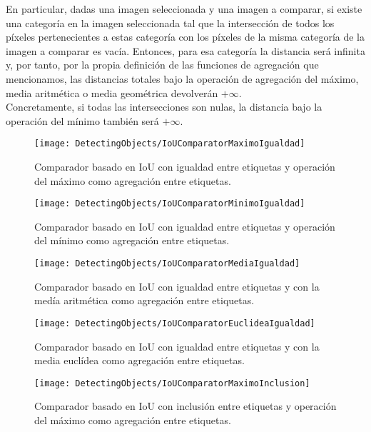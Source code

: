 En particular, dadas una imagen seleccionada y una imagen a comparar, si existe una categoría en la imagen seleccionada tal que la intersección de todos los píxeles pertenecientes a estas categoría con los píxeles de la misma categoría de la imagen a comparar es vacía. Entonces, para esa categoría la distancia será infinita y, por tanto, por la propia definición de las funciones de agregación que mencionamos, las distancias totales bajo la operación de agregación del máximo, media aritmética o media geométrica devolverán $+\infty$.\\

Concretamente, si todas las intersecciones son nulas, la distancia bajo la operación del mínimo también será $+\infty$.\\

\begin{figure}[htpb]
  \centering
  \texttt{[image: DetectingObjects/IoUComparatorMaximoIgualdad]}
  \caption{Comparador basado en IoU con igualdad entre etiquetas y operación del máximo como agregación entre etiquetas.}
  \label{fig:IoUComparatorMaximoIgualdad}
\end{figure}

\begin{figure}[htpb]
  \centering
  \texttt{[image: DetectingObjects/IoUComparatorMinimoIgualdad]}
  \caption{Comparador basado en IoU con igualdad entre etiquetas y operación del mínimo como agregación entre etiquetas.}
  \label{fig:IoUComparatorMinimoIgualdad}
\end{figure}

\begin{figure}[htpb]
  \centering
  \texttt{[image: DetectingObjects/IoUComparatorMediaIgualdad]}
  \caption{Comparador basado en IoU con igualdad entre etiquetas y con la medía aritmética como agregación entre etiquetas.}
  \label{fig:IoUComparatorMediaIgualdad}
\end{figure}

\begin{figure}[htpb]
  \centering
  \texttt{[image: DetectingObjects/IoUComparatorEuclideaIgualdad]}
  \caption{Comparador basado en IoU con igualdad entre etiquetas y con la media euclídea como agregación entre etiquetas.}
  \label{fig:IoUComparatorEuclideaIgualdad}
\end{figure}

\begin{figure}[htpb]
  \centering
  \texttt{[image: DetectingObjects/IoUComparatorMaximoInclusion]}
  \caption{Comparador basado en IoU con inclusión entre etiquetas y operación del máximo como agregación entre etiquetas.}
  \label{fig:IoUComparatorMaximoInclusion}
\end{figure}


